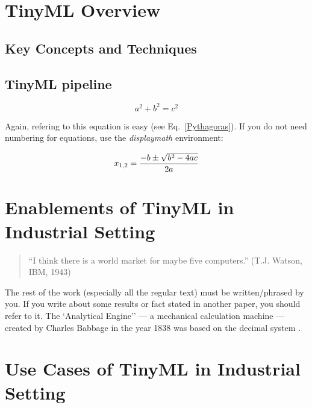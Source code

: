 \documentclass[twocolumn]{article}
\begin{document}
\section{TinyML Overview} 
\label{tinyml_overview}

\subsection{Key Concepts and Techniques}



\subsection{TinyML pipeline}


\begin{equation}
a^2 + b^2 = c^2
\label{Pythagoras}
\end{equation}

Again, refering to this equation is easy (see Eq.~\ref{Pythagoras}).
If you do not need numbering for equations, use the {\em displaymath}
environment:

\begin{displaymath}
x_{1,2} = \frac{-b \pm \sqrt{b^2-4ac}}{2a}\\
\end{displaymath}


\section{Enablements of TinyML in Industrial Setting}
\label{prod_tinyml}

\begin{quote}
	``I think there is a world market for maybe five computers.''
	(T.J. Watson, IBM, 1943)
\end{quote}

The rest of the work (especially all the regular text) must be
written/phrased by you. If you write about some results or fact
stated in another paper, you should refer to it.
The `Analytical Engine'' --- a mechanical calculation machine ---
created by Charles Babbage in the year 1838 was based on the decimal
system
\cite{hussein_original_2024, paul_rethinking_2021, de_prado_robustifying_2020,ren_synergy_2021,roshan_adaptive_2021}.


\section{Use Cases of TinyML in Industrial Setting}
\label{use_cases}
\end{document}
